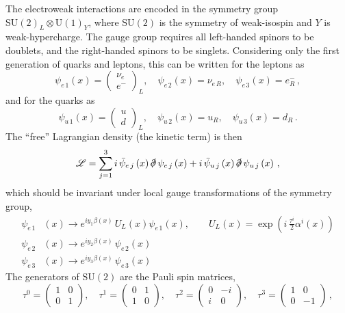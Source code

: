 The electroweak interactions are encoded in the symmetry group $\mathrm{SU}(2)_{L} \otimes \mathrm{U}(1)_{Y}$, where $\mathrm{SU}(2)$ is the symmetry of weak-isospin and $Y$ is weak-hypercharge.
The gauge group requires all left-handed spinors to be doublets, and the right-handed spinors to be singlets.
Considering only the first generation of quarks and leptons, this can be written for the leptons as
\[
 \psi_{e\,1}\left(x\right) = \begin{pmatrix}
  \nu_{e} \\
  e^{-}
 \end{pmatrix}_{L},\quad
 \psi_{e\,2}\left(x\right) = \nu_{e\,R},\quad
 \psi_{e\,3}\left(x\right) = e_{R}^{-}\,,
\]
and for the quarks as
\[
 \psi_{u\,1}\left(x\right) = \begin{pmatrix}
  u \\
  d
 \end{pmatrix}_{L},\quad
 \psi_{u\,2}\left(x\right) = u_{R},\quad
 \psi_{u\,3}\left(x\right) = d_{R}\,.
\]
The ``free'' Lagrangian density (the kinetic term) is then
\[
 \mathscr{L} = \sum_{j=1}^{3} i \,\bar{\psi}_{e\,j}\left(x\right) \slashed{\partial} \,\psi_{e\,j}\left(x\right) + i \,\bar{\psi}_{u\,j}\left(x\right) \slashed{\partial} \,\psi_{u\,j}\left(x\right)\,,
\]
which should be invariant under local gauge transformations of the symmetry group,
\[
 \begin{split}
  \psi_{e\,1}&\left(x\right) \to e^{iy_{1} \beta(x)}\, U_{L}\left(x\right)\psi_{e\,1}\left(x\right), \qquad U_{L}\left(x\right) = \exp\left(i\,\frac{\tau^{i}}{2} \alpha^{i}(x)\right)\\
  \psi_{e\,2}&\left(x\right) \to e^{iy_{2} \beta(x)}\, \psi_{e\,2}\left(x\right)\\
  \psi_{e\,3}&\left(x\right) \to e^{iy_{3} \beta(x)}\, \psi_{e\,3}\left(x\right)
 \end{split}
\]
The generators of $\mathrm{SU}(2)$ are the Pauli spin matrices,
\[
 \tau^{0} = \begin{pmatrix}%
  1 & 0 \\%
  0 & 1
 \end{pmatrix},\quad
 \tau^{1} = \begin{pmatrix}%
  0 & 1 \\%
  1 & 0
 \end{pmatrix},\quad
 \tau^{2} = \begin{pmatrix}%
  0 & -i \\%
  i & 0
 \end{pmatrix},\quad
 \tau^{3} = \begin{pmatrix}%
  1 & 0  \\%
  0 & -1 %
 \end{pmatrix}\,,%
\]
